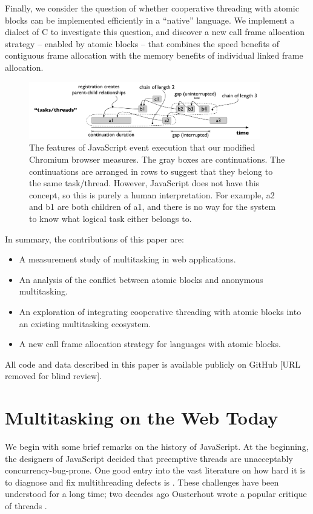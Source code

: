 \documentclass[sigplan,10pt,review,anonymous]{acmart}\settopmatter{printfolios=true,printccs=false,printacmref=false}
\begin{document}
Finally, we consider the question of whether cooperative threading with atomic blocks can be implemented efficiently in a ``native'' language.
We implement a dialect of C to investigate this question, and discover a new call frame allocation strategy -- enabled by atomic blocks -- that combines the speed benefits of contiguous frame allocation with the memory benefits of individual linked frame allocation.

\begin{figure}
\includegraphics[width=0.9\textwidth]{continuation_tree}
\caption{The features of JavaScript event execution that our modified Chromium browser measures.
  The gray boxes are continuations.
  The continuations are arranged in rows to suggest that they belong to the same task/thread.
  However, JavaScript does not have this concept, so this is purely a human interpretation.
  For example, a2 and b1 are both children of a1, and there is no way for the system to know what logical task either belongs to.}
\label{fig:continuation_tree}
\end{figure}

In summary, the contributions of this paper are:
\begin{itemize}
\item A measurement study of multitasking in web applications.
\item An analysis of the conflict between atomic blocks and anonymous multitasking.
\item An exploration of integrating cooperative threading with atomic blocks into an existing multitasking ecosystem.
\item A new call frame allocation strategy for languages with atomic blocks.
\end{itemize}

All code and data described in this paper is available publicly on GitHub [URL removed for blind review].

\section{Multitasking on the Web Today}

We begin with some brief remarks on the history of JavaScript.
At the beginning, the designers of JavaScript decided that preemptive threads are unacceptably concurrency-bug-prone.
One good entry into the vast literature on how hard it is to diagnose and fix multithreading defects is \cite{Lu2008}.
These challenges have been understood for a long time; two decades ago Ousterhout wrote a popular critique of threads \cite{Ousterhout1996}.
\end{document}
